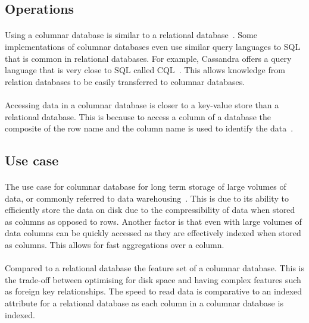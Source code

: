 \documentclass{CRPITStyle}
\renewcommand{\cite}{\citep}
\begin{document}
\subsection{Operations}

\paragraph{}
Using a columnar database is similar to a relational database~\cite{usingcolumn}.
Some implementations of columnar databases even use similar query languages to
SQL that is common in relational databases.
For example, Cassandra offers a query language that is very close to
SQL called CQL~\cite{cassandra}.
This allows knowledge from relation databases to be easily transferred to
columnar databases.

\paragraph{}
Accessing data in a columnar database is closer to a key-value
store than a relational database.
This is because to access a column of a database the composite of
the row name and the column name is used to identify the
data~\cite{nosql_survey,usingcolumn}.

\subsection{Use case}

\paragraph{}
The use case for columnar database for long term storage of large volumes of
data, or commonly referred to data warehousing~\cite{usingcolumn,bigtable}.
This is due to its ability to efficiently store the data on disk
due to the compressibility of data when stored as columns as opposed
to rows.
Another factor is that even with large volumes of data columns can
be quickly accessed as they are effectively indexed when stored as
columns.
This allows for fast aggregations over a column.

\paragraph{}
Compared to a relational database the feature set of a columnar database.
This is the trade-off between optimising for disk space and having
complex features such as foreign key relationships.
The speed to read data is comparative to an indexed attribute
for a relational database as each column in a columnar database is
indexed.
\end{document}
